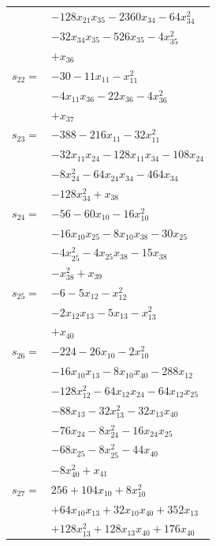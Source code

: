 \begin{longtable}{@{}r@{\;}l@{}}
 & \(\displaystyle -128x_{21}x_{35} -2360x_{34} -64x_{34}^{2}\) \\
 & \(\displaystyle -32x_{34}x_{35} -526x_{35} -4x_{35}^{2}\) \\
 & \(\displaystyle +x_{36}\) \\[3pt]
\(s_{22}=\) & \(\displaystyle -30 -11x_{11} -x_{11}^{2}\) \\
 & \(\displaystyle -4x_{11}x_{36} -22x_{36} -4x_{36}^{2}\) \\
 & \(\displaystyle +x_{37}\) \\[3pt]
\(s_{23}=\) & \(\displaystyle -388 -216x_{11} -32x_{11}^{2}\) \\
 & \(\displaystyle -32x_{11}x_{24} -128x_{11}x_{34} -108x_{24}\) \\
 & \(\displaystyle -8x_{24}^{2} -64x_{24}x_{34} -464x_{34}\) \\
 & \(\displaystyle -128x_{34}^{2} +x_{38}\) \\[3pt]
\(s_{24}=\) & \(\displaystyle -56 -60x_{10} -16x_{10}^{2}\) \\
 & \(\displaystyle -16x_{10}x_{25} -8x_{10}x_{38} -30x_{25}\) \\
 & \(\displaystyle -4x_{25}^{2} -4x_{25}x_{38} -15x_{38}\) \\
 & \(\displaystyle -x_{38}^{2} +x_{39}\) \\[3pt]
\(s_{25}=\) & \(\displaystyle -6 -5x_{12} -x_{12}^{2}\) \\
 & \(\displaystyle -2x_{12}x_{13} -5x_{13} -x_{13}^{2}\) \\
 & \(\displaystyle +x_{40}\) \\[3pt]
\(s_{26}=\) & \(\displaystyle -224 -26x_{10} -2x_{10}^{2}\) \\
 & \(\displaystyle -16x_{10}x_{13} -8x_{10}x_{40} -288x_{12}\) \\
 & \(\displaystyle -128x_{12}^{2} -64x_{12}x_{24} -64x_{12}x_{25}\) \\
 & \(\displaystyle -88x_{13} -32x_{13}^{2} -32x_{13}x_{40}\) \\
 & \(\displaystyle -76x_{24} -8x_{24}^{2} -16x_{24}x_{25}\) \\
 & \(\displaystyle -68x_{25} -8x_{25}^{2} -44x_{40}\) \\
 & \(\displaystyle -8x_{40}^{2} +x_{41}\) \\[3pt]
\(s_{27}=\) & \(\displaystyle 256 +104x_{10} +8x_{10}^{2}\) \\
 & \(\displaystyle +64x_{10}x_{13} +32x_{10}x_{40} +352x_{13}\) \\
 & \(\displaystyle +128x_{13}^{2} +128x_{13}x_{40} +176x_{40}\) \\

\end{longtable}
